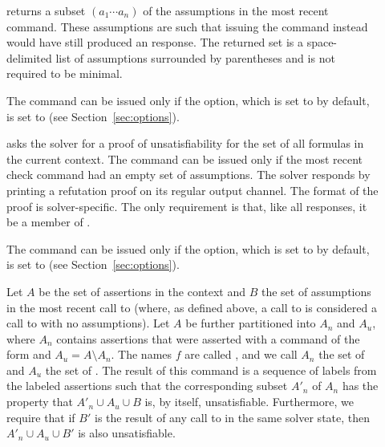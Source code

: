 \begin{description}
%
\item[]
returns a subset $(a_1 \cdots a_n)$ of the assumptions in the most recent
 command.
These assumptions are such that issuing the command
instead would have still produced an  response.
The returned set is a space-delimited list of assumptions surrounded by
parentheses and is not required to be minimal.

The command can be issued only if the  option,
which is set to  by default, is set to  
(see Section~\ref{sec:options}).
\smallskip

%
\item[]
asks the solver for a proof of unsatisfiability for the set of all formulas
in the current context.  
The command can be issued only if the most recent check command had an empty set 
of assumptions.
The solver responds by printing a refutation proof 
on its regular output channel.
The format of the proof is solver-specific.
The only requirement is that, like all responses, it be a member 
of .

The command can be issued only if the  option,
which is set to  by default, is set to  
(see Section~\ref{sec:options}).
\smallskip

%
\item[]
Let $A$ be the set of assertions in the context and $B$ the set of assumptions
in the most recent call to  
(where, as defined above, a call to  is considered a call to 
with no assumptions).
Let $A$ be further partitioned into $A_n$ and $A_u$, where
$A_n$ contains assertions that were asserted with a command of the form
 and $A_u = A \setminus A_n$.
The names $f$ are called , and we call $A_n$ the set of
 and $A_u$ the set of .
The result of this command is a sequence  of
labels from the labeled assertions such that the corresponding subset
$A'_n$ of $A_n$ has the property that $A'_n \cup A_u \cup B$ is, by itself,
unsatisfiable.
Furthermore, we require that if $B'$ is the result of any call to
 in the same solver state, then $A'_n \cup A_u \cup
B'$ is also unsatisfiable.


\end{description}

